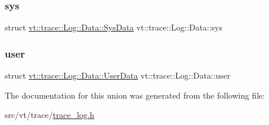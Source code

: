 \subsubsection{\texorpdfstring{sys}{sys}}
{\footnotesize\ttfamily struct \hyperlink{structvt_1_1trace_1_1_log_1_1_data_1_1_sys_data}{vt\+::trace\+::\+Log\+::\+Data\+::\+Sys\+Data}  vt\+::trace\+::\+Log\+::\+Data\+::sys}

\mbox{\label{unionvt_1_1trace_1_1_log_1_1_data_a8d893c0de3ee2fca0852607fa908a2e6}} 
\subsubsection{\texorpdfstring{user}{user}}
{\footnotesize\ttfamily struct \hyperlink{structvt_1_1trace_1_1_log_1_1_data_1_1_user_data}{vt\+::trace\+::\+Log\+::\+Data\+::\+User\+Data}  vt\+::trace\+::\+Log\+::\+Data\+::user}



The documentation for this union was generated from the following file\+:\begin{DoxyCompactItemize}
\item 
src/vt/trace/\hyperlink{trace__log_8h}{trace\+\_\+log.\+h}\end{DoxyCompactItemize}
